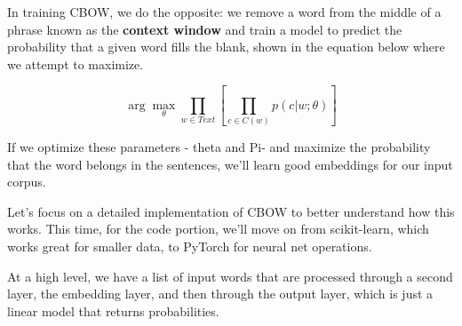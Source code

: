 \documentclass[11pt, table]{diazessay} %
\begin{document}
\begin{sloppypar}
In training CBOW, we do the opposite: we remove a word from the middle of a phrase known as the \textbf{context window} and train  a model to predict the probability that a given word fills the blank, shown in the equation below where we attempt to maximize.

\begin{equation}
\arg\max_\theta \prod_{w\in Text}\left[\prod_{c \in C(w)} p(c|w;\theta)\right]
\end{equation}

If we optimize these parameters - theta and Pi-  and maximize the probability that the word belongs in the sentences, we'll learn good embeddings for our input corpus.

Let's focus on a detailed implementation of CBOW to better understand how this works. This time, for the code portion, we'll move on from scikit-learn, which works great for smaller data, to PyTorch for neural net operations.  

At a high level, we have a list of input words that are processed through a second layer, the embedding layer, and then through the output layer, which is just a linear model that returns probabilities.

\def\layersep{2.5cm}
 \begin{figure}[H]
\end{figure}
\end{sloppypar}
\end{document}
